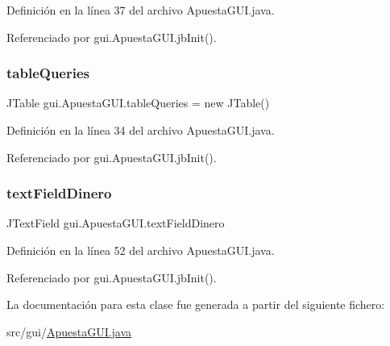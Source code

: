Definición en la línea 37 del archivo Apuesta\+G\+U\+I.\+java.



Referenciado por gui.\+Apuesta\+G\+U\+I.\+jb\+Init().

\mbox{\label{classgui_1_1ApuestaGUI_a5289b9952a5f334001b12e1ef4b1a6b0}} 
\subsubsection{\texorpdfstring{tableQueries}{tableQueries}}
{\footnotesize\ttfamily J\+Table gui.\+Apuesta\+G\+U\+I.\+table\+Queries = new J\+Table()\hspace{0.3cm}{\ttfamily [private]}}



Definición en la línea 34 del archivo Apuesta\+G\+U\+I.\+java.



Referenciado por gui.\+Apuesta\+G\+U\+I.\+jb\+Init().

\mbox{\label{classgui_1_1ApuestaGUI_abf62f989314e3bf1f528896cd17c247e}} 
\subsubsection{\texorpdfstring{textFieldDinero}{textFieldDinero}}
{\footnotesize\ttfamily J\+Text\+Field gui.\+Apuesta\+G\+U\+I.\+text\+Field\+Dinero\hspace{0.3cm}{\ttfamily [private]}}



Definición en la línea 52 del archivo Apuesta\+G\+U\+I.\+java.



Referenciado por gui.\+Apuesta\+G\+U\+I.\+jb\+Init().



La documentación para esta clase fue generada a partir del siguiente fichero\+:\begin{DoxyCompactItemize}
\item 
src/gui/\mbox{\hyperlink{ApuestaGUI_8java}{Apuesta\+G\+U\+I.\+java}}\end{DoxyCompactItemize}
